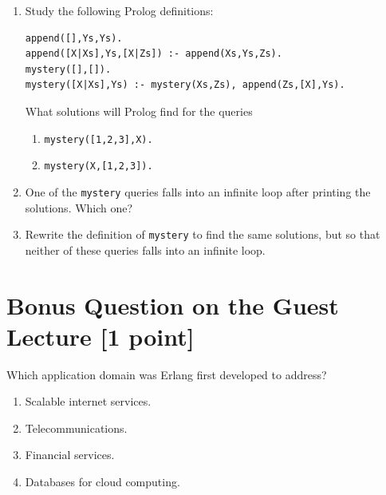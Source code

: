 \documentclass{article}
\begin{document}
\begin{enumerate}
\item
Study the following Prolog definitions:
\begin{verbatim}
append([],Ys,Ys).
append([X|Xs],Ys,[X|Zs]) :- append(Xs,Ys,Zs).
mystery([],[]).
mystery([X|Xs],Ys) :- mystery(Xs,Zs), append(Zs,[X],Ys).
\end{verbatim}
What solutions will Prolog find for the queries
\begin{enumerate}
\item \verb!mystery([1,2,3],X).!
\item \verb!mystery(X,[1,2,3]).!
\end{enumerate}

\item
One of the \verb!mystery! queries falls into an infinite loop after
printing the solutions. Which one?


\item
Rewrite the definition of \verb!mystery! to find the same solutions,
but so that neither of these queries falls into an infinite loop.

\end{enumerate}


\newpage
\section{Bonus Question on the Guest Lecture [1 point]}

Which application domain was Erlang first developed to address?
\begin{enumerate}
\item Scalable internet services.
\item Telecommunications.
\item Financial services.
\item Databases for cloud computing.
\end{enumerate}
\end{document}
